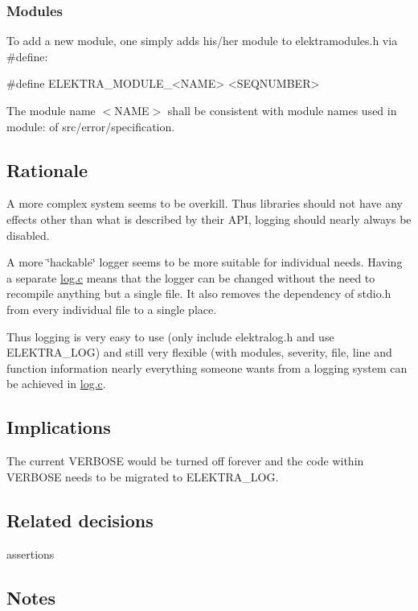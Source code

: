 \subsubsection*{Modules}

To add a new module, one simply adds his/her module to {\ttfamily elektramodules.\+h} via {\ttfamily \#define}\+: \begin{DoxyVerb}#define ELEKTRA_MODULE_<NAME> <SEQNUMBER>
\end{DoxyVerb}


The module name {\ttfamily $<$N\+A\+ME$>$} shall be consistent with module names used in {\ttfamily module\+:} of {\ttfamily src/error/specification}.

\subsection*{Rationale}

A more complex system seems to be overkill. Thus libraries should not have any effects other than what is described by their A\+PI, logging should nearly always be disabled.

A more \char`\"{}hackable\char`\"{} logger seems to be more suitable for individual needs. Having a separate {\ttfamily \hyperlink{log_8c}{log.\+c}} means that the logger can be changed without the need to recompile anything but a single file. It also removes the dependency of {\ttfamily stdio.\+h} from every individual file to a single place.

Thus logging is very easy to use (only include {\ttfamily elektralog.\+h} and use {\ttfamily E\+L\+E\+K\+T\+R\+A\+\_\+\+L\+OG}) and still very flexible (with modules, severity, file, line and function information nearly everything someone wants from a logging system can be achieved in {\ttfamily \hyperlink{log_8c}{log.\+c}}.

\subsection*{Implications}

The current V\+E\+R\+B\+O\+SE would be turned off forever and the code within V\+E\+R\+B\+O\+SE needs to be migrated to {\ttfamily E\+L\+E\+K\+T\+R\+A\+\_\+\+L\+OG}.

\subsection*{Related decisions}


\begin{DoxyItemize}
\item assertions
\end{DoxyItemize}

\subsection*{Notes}